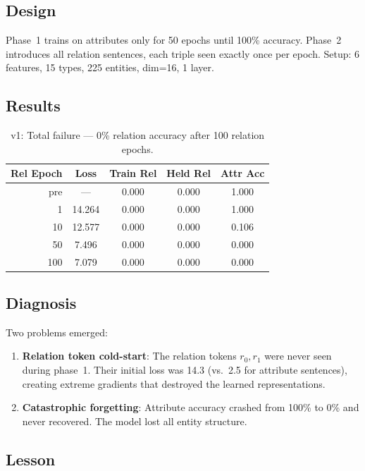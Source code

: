 \documentclass[11pt]{article}
\begin{document}
\subsection{Design}

Phase~1 trains on attributes only for 50 epochs until 100\% accuracy.
Phase~2 introduces all relation sentences, each triple seen exactly once per epoch.
Setup: 6 features, 15 types, 225 entities, dim=16, 1 layer.

\subsection{Results}

\begin{table}[h]
\centering
\caption{v1: Total failure --- 0\% relation accuracy after 100 relation epochs.}
\begin{tabular}{rcccc}
\toprule
Rel Epoch & Loss & Train Rel & Held Rel & Attr Acc \\
\midrule
pre & --- & 0.000 & 0.000 & 1.000 \\
1 & 14.264 & 0.000 & 0.000 & 1.000 \\
10 & 12.577 & 0.000 & 0.000 & 0.106 \\
50 & 7.496 & 0.000 & 0.000 & 0.000 \\
100 & 7.079 & 0.000 & 0.000 & 0.000 \\
\bottomrule
\end{tabular}
\end{table}

\subsection{Diagnosis}

Two problems emerged:
\begin{enumerate}
\item \textbf{Relation token cold-start}: The relation tokens $r_0, r_1$ were never
  seen during phase~1. Their initial loss was 14.3 (vs.\ 2.5 for attribute sentences),
  creating extreme gradients that destroyed the learned representations.
\item \textbf{Catastrophic forgetting}: Attribute accuracy crashed from 100\% to 0\%
  and never recovered. The model lost all entity structure.
\end{enumerate}

\subsection{Lesson}
\end{document}
